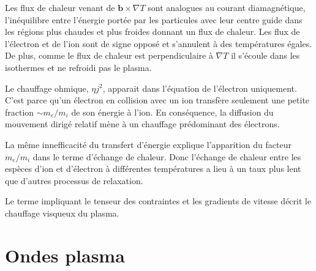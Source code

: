 \documentclass[main.tex]{subfiles}
\begin{document}
Les flux de chaleur venant de \( \bm{b} \times \nabla T \)  sont analogues au courant diamagnétique, l'inéquilibre entre l'énergie portée par les particules avec leur centre guide dans les régions plus chaudes et plus froides donnant un flux de chaleur.
Les flux de l'électron et de l'ion sont de signe opposé et s'annulent à des températures égales.
De plus, comme le flux de chaleur est perpendiculaire à \( \nabla T \) il s'écoule dans les isothermes et ne refroidi pas le plasma.

Le chauffage ohmique, \( \eta j^2 \), apparait dans l'équation de l'électron uniquement.
C'est parce qu'un électron en collision avec un ion transfère seulement une petite fraction \( \sim m_e/m_i \) de son énergie à l'ion.
En conséquence, la diffusion du mouvement dirigé relatif mène à un chauffage prédominant des électrons.

La même innefficacité du transfert d'énergie explique l'apparition du facteur \( m_e/m_i \) dans le terme d'échange de chaleur.
Donc l'échange de chaleur entre les espèces d'ion et d'électron à différentes températures a lieu à un taux plus lent que d'autres processus de relaxation.

Le terme impliquant le tenseur des contraintes et les gradients de vitesse décrit le chauffage visqueux du plasma.

\section{Ondes plasma}
\end{document}
